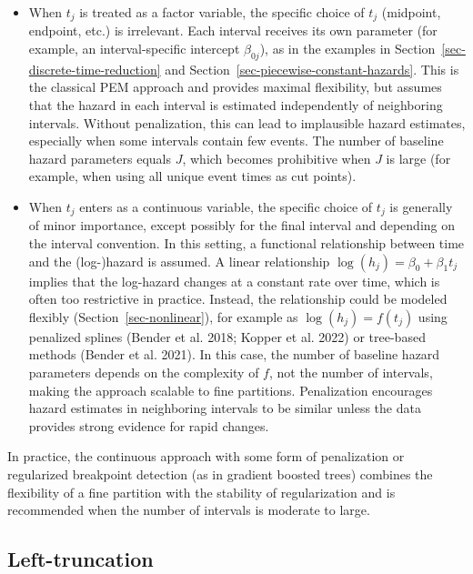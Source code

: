 \documentclass[
  letterpaper,
  krantz2]{style/krantz}
\providecommand{\tightlist}{%
  \setlength{\itemsep}{0pt}\setlength{\parskip}{0pt}}
\begin{document}
\begin{itemize}
\tightlist
\item
  When \(t_j\) is treated as a factor variable, the specific choice of
  \(t_j\) (midpoint, endpoint, etc.) is irrelevant. Each interval
  receives its own parameter (for example, an interval-specific
  intercept \(\beta_{0j}\)), as in the examples in
  Section~\ref{sec-discrete-time-reduction} and
  Section~\ref{sec-piecewise-constant-hazards}. This is the classical
  PEM approach and provides maximal flexibility, but assumes that the
  hazard in each interval is estimated independently of neighboring
  intervals. Without penalization, this can lead to implausible hazard
  estimates, especially when some intervals contain few events. The
  number of baseline hazard parameters equals \(J\), which becomes
  prohibitive when \(J\) is large (for example, when using all unique
  event times as cut points).
\item
  When \(t_j\) enters as a continuous variable, the specific choice of
  \(t_j\) is generally of minor importance, except possibly for the
  final interval and depending on the interval convention. In this
  setting, a functional relationship between time and the (log-)hazard
  is assumed. A linear relationship
  \(\log(h_j) = \beta_0 + \beta_1 t_j\) implies that the log-hazard
  changes at a constant rate over time, which is often too restrictive
  in practice. Instead, the relationship could be modeled flexibly
  (Section~\ref{sec-nonlinear}), for example as \(\log(h_j) = f(t_j)\)
  using penalized splines (Bender et al. 2018; Kopper et al. 2022) or
  tree-based methods (Bender et al. 2021). In this case, the number of
  baseline hazard parameters depends on the complexity of \(f\), not the
  number of intervals, making the approach scalable to fine partitions.
  Penalization encourages hazard estimates in neighboring intervals to
  be similar unless the data provides strong evidence for rapid
  changes.
\end{itemize}

In practice, the continuous approach with some form of penalization or
regularized breakpoint detection (as in gradient boosted trees) combines
the flexibility of a fine partition with the stability of regularization
and is recommended when the number of intervals is moderate to large.

\subsection{Left-truncation}\label{sec-left-truncation-intervals}
\end{document}

